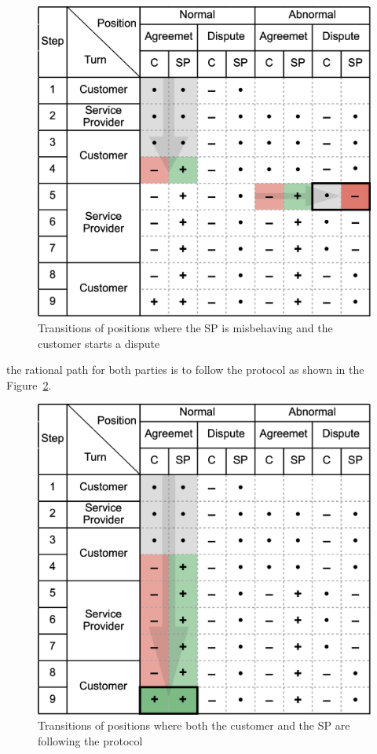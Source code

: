 \documentclass[pdftex,twocolumn,epjc3]{svjour3}
\begin{document}
{\begin{figure}[h!]
\includegraphics[width=\linewidth]{misbehaviour.png}
\centering
\caption{Transitions of positions where the SP is misbehaving and the customer starts a dispute}
\label{fig:misbehaviour}
\end{figure}
the rational path for both parties is to follow the protocol as shown in the Figure~\ref{fig:rational}.

\begin{figure}[h!]
\includegraphics[width=\linewidth]{rational.png}
\centering
\caption{Transitions of positions where both the customer and the SP are following the protocol}
\label{fig:rational}
\end{figure}

}
\end{document}
